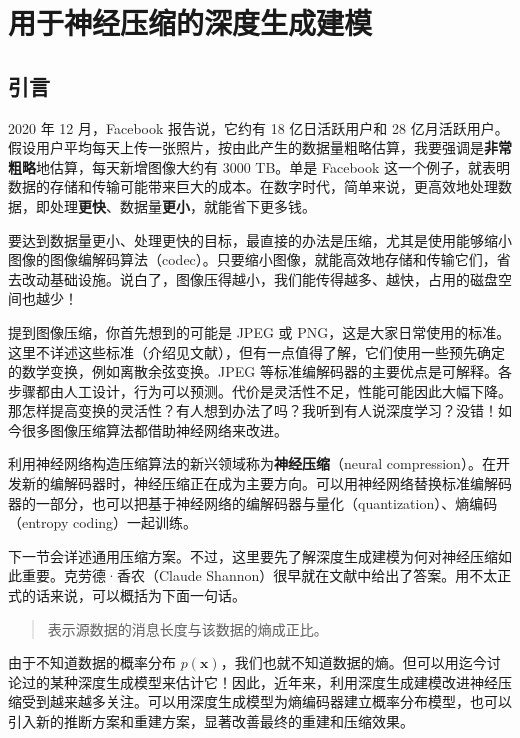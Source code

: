 \chapter{用于神经压缩的深度生成建模}
\label{chap:10}

\section{引言}
\label{sec:10-01}

2020 年 12 月，Facebook 报告说，它约有 18 亿日活跃用户和 28 亿月活跃用户。假设用户平均每天上传一张照片，按由此产生的数据量粗略估算，我要强调是\textbf{非常粗略}地估算，每天新增图像大约有 3000 TB。单是 Facebook 这一个例子，就表明数据的存储和传输可能带来巨大的成本。在数字时代，简单来说，更高效地处理数据，即处理\textbf{更快}、数据量\textbf{更小}，就能省下更多钱。

要达到数据量更小、处理更快的目标，最直接的办法是压缩，尤其是使用能够缩小图像的图像编解码算法（codec）。只要缩小图像，就能高效地存储和传输它们，省去改动基础设施。说白了，图像压得越小，我们能传得越多、越快，占用的磁盘空间也越少！

提到图像压缩，你首先想到的可能是 JPEG 或 PNG，这是大家日常使用的标准。这里不详述这些标准（介绍见文献），但有一点值得了解，它们使用一些预先确定的数学变换，例如离散余弦变换。JPEG 等标准编解码器的主要优点是可解释。各步骤都由人工设计，行为可以预测。代价是灵活性不足，性能可能因此大幅下降。那怎样提高变换的灵活性？有人想到办法了吗？我听到有人说深度学习？没错！如今很多图像压缩算法都借助神经网络来改进。

利用神经网络构造压缩算法的新兴领域称为\textbf{神经压缩}（neural compression）。在开发新的编解码器时，神经压缩正在成为主要方向。可以用神经网络替换标准编解码器的一部分，也可以把基于神经网络的编解码器与量化（quantization）、熵编码（entropy coding）一起训练。

下一节会详述通用压缩方案。不过，这里要先了解深度生成建模为何对神经压缩如此重要。克劳德·香农（Claude Shannon）很早就在文献中给出了答案。用不太正式的话来说，可以概括为下面一句话。
\begin{quote}
  \centering 表示源数据的消息长度与该数据的熵成正比。
\end{quote}

由于不知道数据的概率分布 $p(\mathbf x)$，我们也就不知道数据的熵。但可以用迄今讨论过的某种深度生成模型来估计它！因此，近年来，利用深度生成建模改进神经压缩受到越来越多关注。可以用深度生成模型为熵编码器建立概率分布模型，也可以引入新的推断方案和重建方案，显著改善最终的重建和压缩效果。

